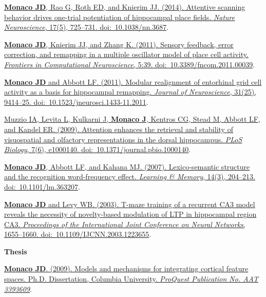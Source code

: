\documentclass[10pt]{article}
\begin{document}
\begin{description}
\item \href{http://dx.doi.org/10.1038/nn.3687}{\textbf{Monaco JD}, Rao G, Roth ED, and Knierim JJ. (2014). Attentive scanning behavior drives one-trial potentiation of hippocampal place fields. \emph{Nature Neuroscience}, 17(5), 725--731. doi:~10.1038/nn.3687}.
\item \href{http://dx.doi.org/10.3389/fncom.2011.00039}{\textbf{Monaco JD}, Knierim JJ, and Zhang K. (2011). Sensory feedback, error correction, and remapping in a multiple oscillator model of place cell activity. \emph{Frontiers in Computational Neuroscience}, 5:39. doi:~10.3389/fncom.2011.00039}.
\item \href{http://dx.doi.org/10.1523/JNEUROSCI.1433-11.2011}{\textbf{Monaco JD} and Abbott LF. (2011). Modular realignment of entorhinal grid cell activity as a basis for hippocampal remapping. \emph{Journal of Neuroscience}, 31(25), 9414--25. doi:~10.1523/jneurosci.1433-11.2011}.
\item \href{http://dx.doi.org/10.1371/journal.pbio.1000140}{Muzzio IA, Levita L, Kulkarni J, \textbf{Monaco J}, Kentros CG, Stead M, Abbott LF, and Kandel ER. (2009). Attention enhances the retrieval and stability of visuospatial and olfactory representations in the dorsal hippocampus. \emph{PLoS Biology}, 7(6), e1000140. doi:~10.1371/journal.pbio.1000140}.
\item \href{http://dx.doi.org/10.1101/lm.363207}{\textbf{Monaco JD}, Abbott LF, and Kahana MJ. (2007). Lexico-semantic structure and the recognition word-frequency effect. \emph{Learning \& Memory}, 14(3), 204--213. doi:~10.1101/lm.363207}.
\item \href{http://dx.doi.org/10.1109/IJCNN.2003.1223655}{\textbf{Monaco JD} and Levy WB. (2003). T-maze training of a recurrent CA3 model reveals the necessity of novelty-based modulation of LTP in hippocampal region CA3. \emph{Proceedings of the  International Joint Conference on Neural Networks}, 1655--1660. doi:~10.1109/IJCNN.2003.1223655}.
\end{description}

{\large \textbf{Thesis}}

\begin{description}
\item \href{http://search.proquest.com/docview/304862872/abstract}{\textbf{Monaco JD}. (2009). Models and mechanisms for integrating cortical feature spaces. Ph.D. Dissertation, Columbia University. \emph{ProQuest Publication No. AAT 3393609}}.
\end{description}
\end{document}
